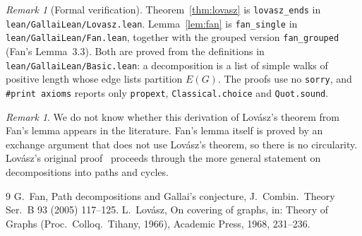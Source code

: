 \documentclass[11pt]{amsart}
\theoremstyle{remark}
\newtheorem{remark}[theorem]{Remark}
\begin{document}
\begin{remark}[Formal verification]
Theorem~\ref{thm:lovasz} is \texttt{lovasz\_ends} in \texttt{lean/GallaiLean/Lovasz.lean}. Lemma~\ref{lem:fan} is
\texttt{fan\_single} in \texttt{lean/GallaiLean/Fan.lean}, together with the grouped version
\texttt{fan\_grouped} (Fan's Lemma~3.3). Both are proved from the definitions in
\texttt{lean/GallaiLean/Basic.lean}: a decomposition is a list of simple walks of positive length whose
edge lists partition $E(G)$. The proofs use no \texttt{sorry}, and \texttt{\#print axioms} reports only
\texttt{propext}, \texttt{Classical.choice} and \texttt{Quot.sound}.
\end{remark}

\begin{remark}
We do not know whether this derivation of Lov\'asz's theorem from Fan's lemma appears in the
literature. Fan's lemma itself is proved by an exchange argument that does not use Lov\'asz's theorem, so
there is no circularity. Lov\'asz's original proof~\cite{L68} proceeds through the more general statement
on decompositions into paths and cycles.
\end{remark}

\begin{thebibliography}{9}
 G.~Fan, Path decompositions and Gallai's conjecture, J.~Combin.\ Theory Ser.~B 93 (2005) 117--125.
 L.~Lov\'asz, On covering of graphs, in: Theory of Graphs (Proc.\ Colloq.\ Tihany, 1966),
Academic Press, 1968, 231--236.
\end{thebibliography}
\end{document}
